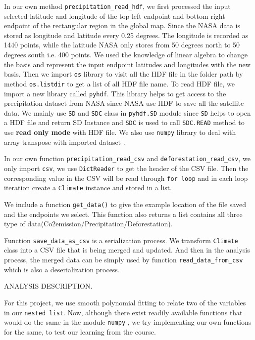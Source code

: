 \documentclass[12pt]{article}
\begin{document}
\begin{enumerate}
\begin{text}
In our own method \texttt{precipitation\_read\_hdf}, we first processed the input selected latitude and longitude of the top left endpoint and bottom right endpoint of the rectangular region in the global map. Since the NASA data is stored as longitude and latitude every 0.25 degrees. The longitude is recorded as 1440 points, while the latitude NASA only stores from 50 degrees north to 50 degrees south i.e. 400 points\citep{N3B43}. We used the knowledge of linear algebra to change the basis and represent the input endpoint latitudes and longitudes with the new basis. Then we import \texttt{os} library to visit all the HDF file in the folder path by method \texttt{os.listdir} to get a list of all HDF file name\citep{PytOS}. To read HDF file, we import a new library called \texttt{pyhdf}. This library helps to get access to the precipitation dataset from NASA since NASA use HDF to save all the satellite data. We mainly use \texttt{SD} and \texttt{SDC} class in \texttt{pyhdf.SD} module since \texttt{SD} helps to open a HDF file and return SD Instance and \texttt{SDC} is used to call \texttt{SDC.READ} method to use \textbf{read only mode} with HDF file\citep{Pyhdf}. We also use \texttt{numpy} library to deal with array transpose with imported dataset \citep{Pynpy}.

In our own function \texttt{precipitation\_read\_csv} and \texttt{deforestation\_read\_csv}, we only import \texttt{csv}, we use \texttt{DictReader} to get the header of the CSV file\citep{Pycsv}. Then the corresponding value in the CSV will be read through \texttt{for loop} and in each loop iteration create a \texttt{Climate} instance and stored in a list.

We include a function \texttt{get\_data()} to give the example location of the file saved and the endpoints we select. This function also returns a list contains all three type of data(Co2emission/Precipitation/Deforestation).

Function \texttt{save\_data\_as\_csv} is a serialization process. We transform \texttt{Climate} class into a CSV file that is being merged and updated. And then in the analysis process, the merged data can be simply used by function \texttt{read\_data\_from\_csv} which is also a deserialization process.


ANALYSIS DESCRIPTION.

For this project, we use smooth polynomial fitting to relate two of the variables in our \texttt{nested list}. Now, although there exist readily available functions that would do the same in the module \texttt{numpy} \citep{Sci20}, we try implementing our own functions for the same, to test our learning from the course.


\end{text}
\end{enumerate}
\end{document}

